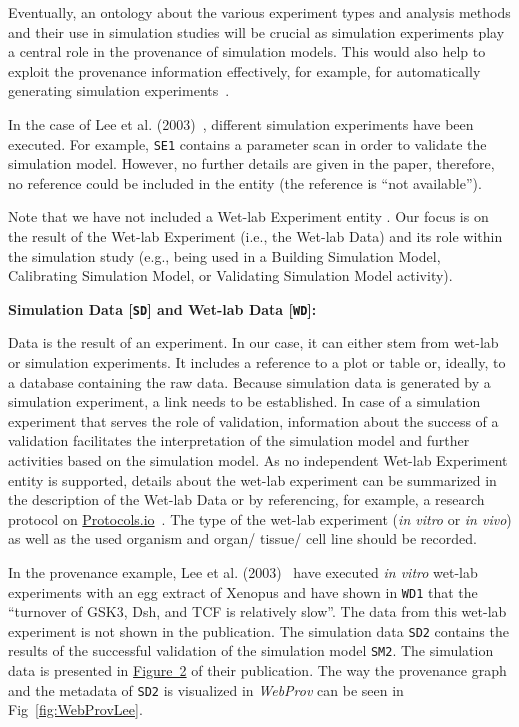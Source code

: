\documentclass[10pt,letterpaper]{article}
\newcommand{\webprov}{\textit{WebProv}}
\newcommand{\lee}{Lee et al. (2003)}
\newcommand{\SD}{Simulation Data}
\newcommand{\WD}{Wet-lab Data}
\newcommand{\WE}{Wet-lab Experiment}
\newcommand{\BSM}{Building Simulation Model}
\newcommand{\CSM}{Calibrating Simulation Model}
\newcommand{\VSM}{Validating Simulation Model}
\begin{document}
Eventually, an ontology about the various experiment types and analysis methods and their use in simulation studies will be crucial as simulation experiments play a central role in the provenance of simulation models.
This would also help to exploit the provenance information effectively, for example, for automatically generating simulation experiments~\cite{Wilsdorf2020a}.

In the case of \lee{}~\cite{Lee2003}, different simulation experiments have been executed.
For example, \texttt{SE1} contains a parameter scan in order to validate the simulation model.
However, no further details are given in the paper, therefore, no reference could be included in the entity (the reference is \enquote{not available}).

Note that we have not included a \WE{} entity .
Our focus is on the result of the \WE{} (i.e., the \WD{}) and its role within the simulation study (e.g., being used in a \BSM{}, \CSM{}, or \VSM{} activity).


\textbf{\SD{} [\texttt{SD}] and \WD{} [\texttt{WD}]:}

\noindent Data is the result of an experiment.
In our case, it can either stem from wet-lab or simulation experiments.
It includes a reference to a plot or table or, ideally, to a database containing the raw data.
Because simulation data is generated by a simulation experiment, a link needs to be established.
In case of a simulation experiment that serves the role of validation, information about the success of a validation facilitates the interpretation of the simulation model and further activities based on the simulation model.
As no independent \WE{} entity is supported, details about the wet-lab experiment can be summarized in the description of the \WD{} or by referencing, for example, a research protocol on \href{https://www.protocols.io/}{Protocols.io}~\cite{Teytelman2016}.
The type of the wet-lab experiment (\textit{in vitro} or \textit{in vivo}) as well as the used organism and organ/ tissue/ cell line should be recorded.

In the provenance example, \lee{}~\cite{Lee2003} have executed \textit{in vitro} wet-lab experiments with an egg extract of Xenopus and have shown in \texttt{WD1} that the \enquote{turnover of GSK3\textbeta, Dsh, and TCF is relatively slow}.
The data from this wet-lab experiment is not shown in the publication.
The simulation data \texttt{SD2} contains the results of the successful validation of the simulation model \texttt{SM2}.
The simulation data is presented in \href{https://doi.org/10.1371/journal.pbio.0000010.g002}{Figure~2} of their publication.
The way the provenance graph and the metadata of \texttt{SD2} is visualized in \webprov{} can be seen in Fig~\ref{fig:WebProvLee}.
\end{document}
